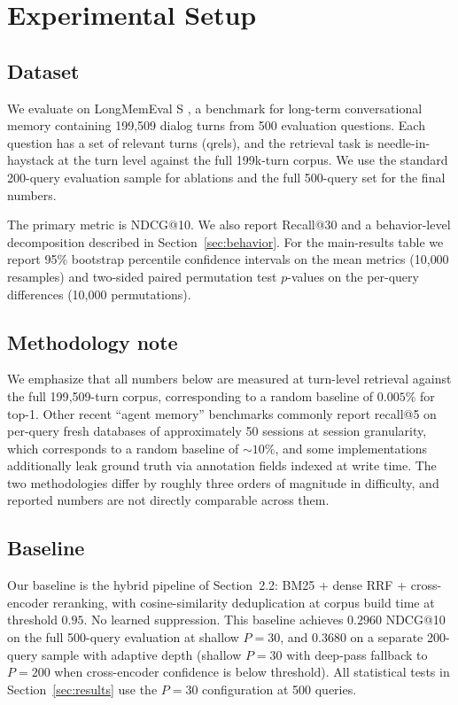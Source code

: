 \documentclass[11pt,a4paper]{article}
\begin{document}
\section{Experimental Setup}

\subsection{Dataset}

We evaluate on LongMemEval S \citep{wu2024longmemeval}, a benchmark for long-term conversational memory containing 199{,}509 dialog turns from 500 evaluation questions. Each question has a set of relevant turns (qrels), and the retrieval task is needle-in-haystack at the turn level against the full 199k-turn corpus. We use the standard 200-query evaluation sample for ablations and the full 500-query set for the final numbers.

The primary metric is NDCG@10. We also report Recall@30 and a behavior-level decomposition described in Section~\ref{sec:behavior}. For the main-results table we report 95\% bootstrap percentile confidence intervals on the mean metrics (10{,}000 resamples) and two-sided paired permutation test $p$-values on the per-query differences (10{,}000 permutations).

\subsection{Methodology note}

We emphasize that all numbers below are measured at turn-level retrieval against the full 199{,}509-turn corpus, corresponding to a random baseline of $0.005\%$ for top-1. Other recent ``agent memory'' benchmarks commonly report recall@5 on per-query fresh databases of approximately 50 sessions at session granularity, which corresponds to a random baseline of $\sim 10\%$, and some implementations additionally leak ground truth via annotation fields indexed at write time. The two methodologies differ by roughly three orders of magnitude in difficulty, and reported numbers are not directly comparable across them.

\subsection{Baseline}

Our baseline is the hybrid pipeline of Section~2.2: BM25 + dense RRF + cross-encoder reranking, with cosine-similarity deduplication at corpus build time at threshold $0.95$. No learned suppression. This baseline achieves $0.2960$ NDCG@10 on the full 500-query evaluation at shallow $P=30$, and $0.3680$ on a separate 200-query sample with adaptive depth (shallow $P=30$ with deep-pass fallback to $P=200$ when cross-encoder confidence is below threshold). All statistical tests in Section~\ref{sec:results} use the $P=30$ configuration at 500 queries.
\end{document}
